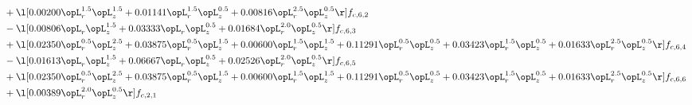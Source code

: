 \begin{alignat}{2}
& + \l[  0.00200 \opL_r^{1.5} \opL_z^{1.5} +  0.01141 \opL_r^{1.5} \opL_z^{0.5} +  0.00816 \opL_r^{2.5} \opL_z^{0.5}  \r] f_{c,6,2} \nonumber \\ 
& - \l[  0.00806 \opL_r \opL_z^{1.5} +  0.03333 \opL_r \opL_z^{0.5} +  0.01684 \opL_r^{2.0} \opL_z^{0.5}  \r] f_{c,6,3} \nonumber \\ 
& + \l[  0.02350 \opL_r^{0.5} \opL_z^{2.5} +  0.03875 \opL_r^{0.5} \opL_z^{1.5} +  0.00600 \opL_r^{1.5} \opL_z^{1.5} +  0.11291 \opL_r^{0.5} \opL_z^{0.5} +  0.03423 \opL_r^{1.5} \opL_z^{0.5} +  0.01633 \opL_r^{2.5} \opL_z^{0.5}  \r] f_{c,6,4} \nonumber \\ 
& - \l[  0.01613 \opL_r \opL_z^{1.5} +  0.06667 \opL_r \opL_z^{0.5} +  0.02526 \opL_r^{2.0} \opL_z^{0.5}  \r] f_{c,6,5} \nonumber \\ 
& + \l[  0.02350 \opL_r^{0.5} \opL_z^{2.5} +  0.03875 \opL_r^{0.5} \opL_z^{1.5} +  0.00600 \opL_r^{1.5} \opL_z^{1.5} +  0.11291 \opL_r^{0.5} \opL_z^{0.5} +  0.03423 \opL_r^{1.5} \opL_z^{0.5} +  0.01633 \opL_r^{2.5} \opL_z^{0.5}  \r] f_{c,6,6} \nonumber \\ 
& + \l[  0.00389 \opL_r^{2.0} \opL_z^{0.5}  \r] f_{c,2,1} \nonumber \\ 
\end{alignat} 


